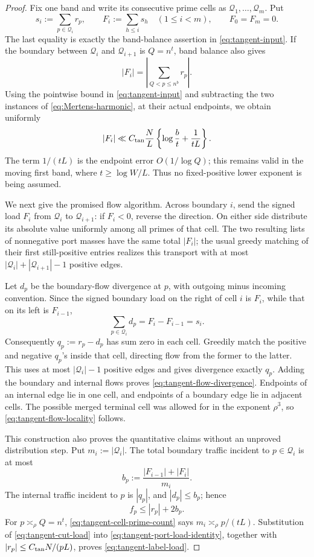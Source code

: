 \documentclass[11pt]{article}
\numberwithin{equation}{section}
\theoremstyle{definition}
\theoremstyle{remark}
\newcommand{\1}{\mathbf 1}
\begin{document}
\begin{proof}
Fix one band and write its consecutive prime cells as
\(\mathcal Q_1,\ldots,\mathcal Q_m\).  Put
\[
 s_i:=\sum_{p\in\mathcal Q_i}r_p,\qquad
 F_i:=\sum_{h\leq i}s_h\quad(1\leq i<m),\qquad
 F_0=F_m=0.
\]
The last equality is exactly the band-balance assertion in
\eqref{eq:tangent-input}.  If the boundary between
\(\mathcal Q_i\) and \(\mathcal Q_{i+1}\) is \(Q=n^t\), band balance also
gives
\[
 |F_i|
 =\left|\sum_{Q<p\leq n^b}r_p\right|.
\]
Using the pointwise bound in \eqref{eq:tangent-input} and subtracting the
two instances of \eqref{eq:Mertens-harmonic}, at their actual endpoints,
we obtain uniformly
\begin{equation}
 |F_i|\ll C_{\rm tan}\frac NL
       \left\{\log\frac bt+\frac1{tL}\right\}.
\label{eq:tangent-cut-load}
\end{equation}
The term \(1/(tL)\) is the endpoint error
\(O(1/\log Q)\); this remains valid in the moving first band, where
\(t\geq\log W/L\).  Thus no fixed-positive lower exponent is being
assumed.

We next give the promised flow algorithm.  Across boundary \(i\), send
the signed load \(F_i\) from \(\mathcal Q_i\) to
\(\mathcal Q_{i+1}\): if \(F_i<0\), reverse the direction.  On either
side distribute its absolute value uniformly among all primes of that
cell.  The two resulting lists of nonnegative port masses have the same
total \(|F_i|\); the usual greedy matching of their first still-positive
entries realizes this transport with at most
\(|\mathcal Q_i|+|\mathcal Q_{i+1}|-1\) positive edges.

Let \(d_p\) be the boundary-flow divergence at \(p\), with outgoing minus
incoming convention.  Since the signed boundary load on the right of
cell \(i\) is \(F_i\), while that on its left is \(F_{i-1}\),
\[
 \sum_{p\in\mathcal Q_i}d_p=F_i-F_{i-1}=s_i.
\]
Consequently \(q_p:=r_p-d_p\) has sum zero in each cell.  Greedily match
the positive and negative \(q_p\)'s inside that cell, directing flow from
the former to the latter.  This uses at most
\(|\mathcal Q_i|-1\) positive edges and gives divergence exactly \(q_p\).
Adding the boundary and internal flows proves
\eqref{eq:tangent-flow-divergence}.  Endpoints of an internal edge lie
in one cell, and endpoints of a boundary edge lie in adjacent cells.
The possible merged terminal cell was allowed for in the exponent
\(\rho^3\), so \eqref{eq:tangent-flow-locality} follows.

This construction also proves the quantitative claims without an
unproved distribution step.  Put \(m_i:=|\mathcal Q_i|\).  The total
boundary traffic incident to \(p\in\mathcal Q_i\) is at most
\[
 b_p:=\frac{|F_{i-1}|+|F_i|}{m_i}.
\]
The internal traffic incident to \(p\) is \(|q_p|\), and
\(|d_p|\leq b_p\); hence
\begin{equation}
                         f_p\leq |r_p|+2b_p.
\label{eq:tangent-port-load-identity}
\end{equation}
For \(p\asymp_\rho Q=n^t\),
\eqref{eq:tangent-cell-prime-count} says
\(m_i\asymp_\rho p/(tL)\).  Substitution of
\eqref{eq:tangent-cut-load} into
\eqref{eq:tangent-port-load-identity}, together with
\(|r_p|\leq C_{\rm tan}N/(pL)\), proves
\eqref{eq:tangent-label-load}.


\end{proof}
\end{document}
